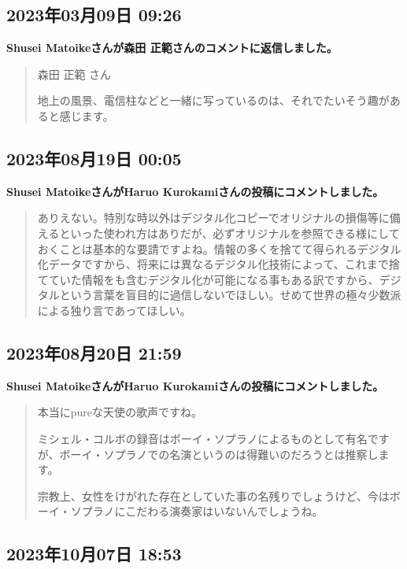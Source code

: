 \subsection*{2023年03月09日 09:26}

\textbf{Shusei Matoikeさんが森田 正範さんのコメントに返信しました。}

\begin{quote}
森田 正範 さん

地上の風景、電信柱などと一緒に写っているのは、それでたいそう趣があると感じます。
\end{quote}

\subsection*{2023年08月19日 00:05}

\textbf{Shusei MatoikeさんがHaruo Kurokamiさんの投稿にコメントしました。}

\begin{quote}
ありえない。特別な時以外はデジタル化コピーでオリジナルの損傷等に備えるといった使われ方はありだが、必ずオリジナルを参照できる様にしておくことは基本的な要請ですよね。情報の多くを捨てて得られるデジタル化データですから、将来には異なるデジタル化技術によって、これまで捨てていた情報をも含むデジタル化が可能になる事もある訳ですから、デジタルという言葉を盲目的に過信しないでほしい。せめて世界の極々少数派による独り言であってほしい。
\end{quote}

\subsection*{2023年08月20日 21:59}

\textbf{Shusei MatoikeさんがHaruo Kurokamiさんの投稿にコメントしました。}

\begin{quote}
本当にpureな天使の歌声ですね。

ミシェル・コルボの録音はボーイ・ソプラノによるものとして有名ですが、ボーイ・ソプラノでの名演というのは得難いのだろうとは推察します。

宗教上、女性をけがれた存在としていた事の名残りでしょうけど、今はボーイ・ソプラノにこだわる演奏家はいないんでしょうね。
\end{quote}

\subsection*{2023年10月07日 18:53}

